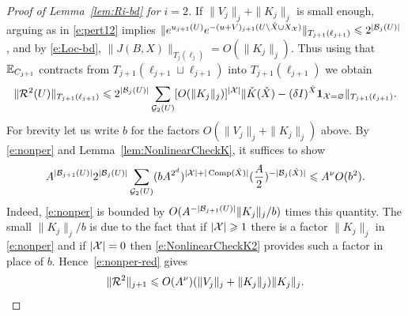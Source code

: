 \documentclass[11pt]{amsart}
\numberwithin{equation}{section}
\numberwithin{theorem}{section}
\newcommand{\1}{{\bf 1}}
\newcommand{\Comp}{\operatorname{Comp}}
\begin{document}
\begin{proof}[Proof of Lemma~\ref{lem:Ri-bd} for $i=2$]
If $\|V_j\|_j + \|K_j\|_j$ is small enough, arguing as in \eqref{e:pert12} implies
$\|e^{u_{j+1}(U)}e^{-(u+V)_{j+1}(U\setminus \check X \cup
  X_{\mathcal X})}\|_{T_{j+1}(\ell_{j+1})}\leqslant 2^{|\mathcal B_{j}(U)|}$, and by
\eqref{e:Loc-bd}, $\|J(B, X)\|_{T_{j}(\ell_{j})} =O(\|K_j\|_{j})$.
Thus using that $\mathbb{E}_{C_{j+1}}$ contracts from
$T_{j+1}(\ell_{j+1}\sqcup \ell_{j+1})$ into $T_{j+1}(\ell_{j+1})$
we obtain
\begin{equation}
\label{e:nonper}
\|\cR^2(U)\|_{T_{j+1}(\ell_{j+1})}
\leq 2^{|\cB_j(U)|}  \sum_{\cG_2(U)}
[O(\|K_j\|_j)]^{|\cX|} \|
\check{K}(\check{X})
-(\delta I)^{\check X}\1_{\cX=\varnothing}
\|_{T_{j+1}(\ell_{j+1})}.
\end{equation}
For brevity let us write $b$ for the factors
$O(\|V_j\|_{j}+\|K_j\|_{j})$ above.  By \eqref{e:nonper} and
Lemma~\ref{lem:NonlinearCheckK}, it suffices to show
\begin{equation} \label{e:nonper-red}
  A^{|\cB_{j+1}(U)|}2^{|\cB_{j}(U)|}
  \sum_{\cG_{2}(U)}
  (b A^{2^{d}}
  )^{|\cX|+|\Comp(\check X)|}
  (\frac{A}{2})^{-|\cB_{j}(\check{X})|} \leq A^{\nu} O(b^2)
  .
\end{equation}
Indeed, \eqref{e:nonper} is bounded by
$O(A^{-|\mathcal B_{j+1}(U)|}\|K_j\|_j/b)$ times this quantity. The small
$\|K_j\|_j/b$ is due to the fact that if $|\mathcal X|\geqslant 1$ there is a
factor $\|K_j\|_j$ in \eqref{e:nonper} and if $|\mathcal X|=0$ then
\eqref{e:NonlinearCheckK2} provides such a factor in place of
$b$. Hence~\eqref{e:nonper-red} gives
\begin{equation}
  \|\mathcal R^2\|_{j+1}
  \leqslant O(A^\nu)(\|V_j\|_j+\|K_j\|_j)\|K_j\|_j.
\end{equation}



\end{proof}
\end{document}
